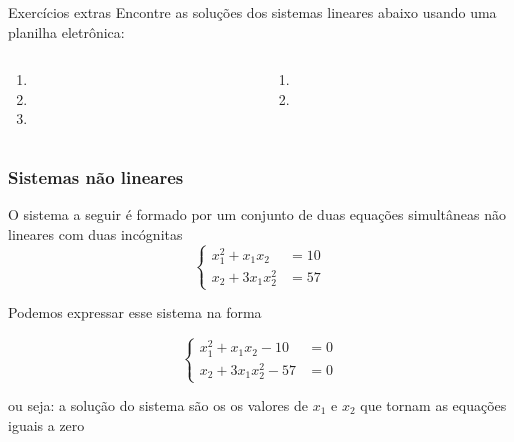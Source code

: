 \begin{frame}{Exercícios extras}
Encontre as soluções dos sistemas lineares abaixo usando uma planilha eletrônica:

\begin{columns}
    \begin{column}{0.45\textwidth}
        \begin{enumerate}
            \item {} 
            \item {}
            \item {}
        \end{enumerate}
    \end{column}
    
    \begin{column}{0.45\textwidth}
        \begin{enumerate}\addtocounter{enumi}{3}
            \item {}
            \item {}
        \end{enumerate}    
    \end{column}
\end{columns}

\end{frame}

\begin{frame}
\frametitle{Sistemas não lineares}

O sistema a seguir é formado por um conjunto de duas equações simultâneas não lineares com duas incógnitas
\[
\begin{cases}
x_1^2 + x_1x_2 &= 10 \\
x_2 + 3x_1x_2^2 &= 57
\end{cases}
\]

Podemos expressar esse sistema na forma

\[
\begin{cases}
x_1^2 + x_1x_2 -10 &= 0 \\
x_2 + 3x_1x_2^2 -57 &= 0
\end{cases}
\]

ou seja: a solução do sistema são os os valores de $x_1$ e $x_2$ que tornam as equações iguais a zero
\end{frame}

